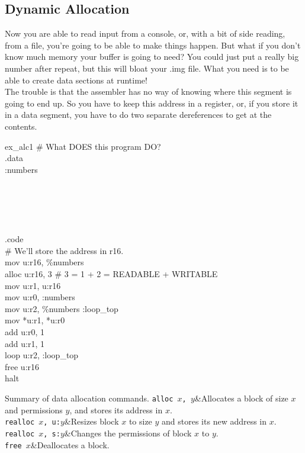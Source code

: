 \documentclass[a4paper,oneside,openany]{book}
\begin{document}
\subsection{Dynamic Allocation}
Now you are able to read input from a console, or, with a bit of side reading,
from a file, you're going to be able to make things happen. But what if you
don't know much memory your buffer is going to need? You could just put a really
big number after repeat, but this will bloat your .img file. What you need
is to be able to create data sections at runtime!\\
The trouble is that the assembler has no way of knowing where this segment is
going to end up. So you have to keep this address in a register, or, if you
store it in a data segment, you have to do two separate dereferences to
get at the contents.
\begin{codefile}{ex\_alc1}
\# What DOES this program DO?\\
.data\\
:numbers\\
\\
\\
\\
\\
\\
.code\\
\>	\# We'll store the address in r16.\\
\>	mov u:r16, \%numbers\\
\>	alloc u:r16, 3 \# 3 = 1 + 2 = READABLE + WRITABLE\\
\>	mov u:r1, u:r16\\
\>	mov u:r0, :numbers\\
\>	mov u:r2, \%numbers
:loop\_top\\
\>	mov *u:r1, *u:r0\\
\>	add u:r0, 1\\
\>	add u:r1, 1\\
\>	loop u:r2, :loop\_top\\
\>	free u:r16\\
\>	halt
\end{codefile}
\begin{codetablefig}{Summary of data allocation commands.}
\texttt{alloc $x$, $y$}&Allocates a block of size $x$ and permissions $y$, and stores its address in $x$.\\
\texttt{realloc $x$, u:$y$}&Resizes block $x$ to size $y$ and stores its new address in $x$.\\
\texttt{realloc $x$, s:$y$}&Changes the permissions of block $x$ to $y$.\\
\texttt{free $x$}&Deallocates a block.\\
\end{codetablefig}
\end{document}
